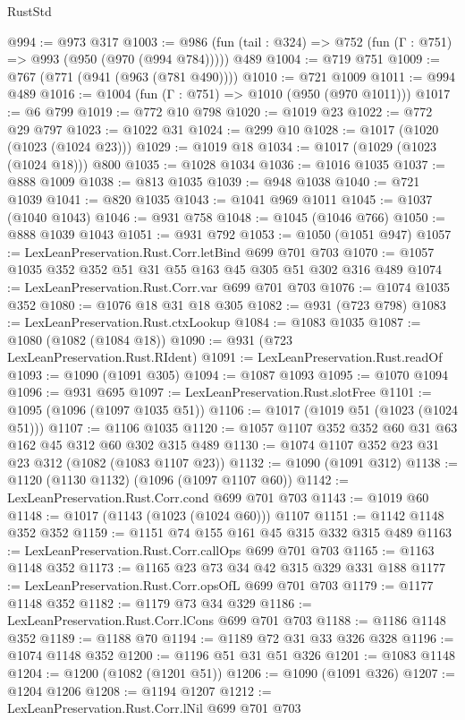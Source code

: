 \begin{lexlean}{RustStd}
\begin{coremodule}
@994 := @973 @317
@1003 := @986 (fun (tail : @324) => @752 (fun (Γ : @751) => @993 (@950 (@970 (@994 @784))))) @489
@1004 := @719 @751
@1009 := @767 (@771 (@941 (@963 (@781 @490))))
@1010 := @721 @1009
@1011 := @994 @489
@1016 := @1004 (fun (Γ : @751) => @1010 (@950 (@970 @1011)))
@1017 := @6 @799
@1019 := @772 @10 @798
@1020 := @1019 @23
@1022 := @772 @29 @797
@1023 := @1022 @31
@1024 := @299 @10
@1028 := @1017 (@1020 (@1023 (@1024 @23)))
@1029 := @1019 @18
@1034 := @1017 (@1029 (@1023 (@1024 @18))) @800
@1035 := @1028 @1034
@1036 := @1016 @1035
@1037 := @888 @1009
@1038 := @813 @1035
@1039 := @948 @1038
@1040 := @721 @1039
@1041 := @820 @1035
@1043 := @1041 @969 @1011
@1045 := @1037 (@1040 @1043)
@1046 := @931 @758
@1048 := @1045 (@1046 @766)
@1050 := @888 @1039 @1043
@1051 := @931 @792
@1053 := @1050 (@1051 @947)
@1057 := LexLeanPreservation.Rust.Corr.letBind @699 @701 @703
@1070 := @1057 @1035 @352 @352 @51 @31 @55 @163 @45 @305 @51 @302 @316 @489
@1074 := LexLeanPreservation.Rust.Corr.var @699 @701 @703
@1076 := @1074 @1035 @352
@1080 := @1076 @18 @31 @18 @305
@1082 := @931 (@723 @798)
@1083 := LexLeanPreservation.Rust.ctxLookup
@1084 := @1083 @1035
@1087 := @1080 (@1082 (@1084 @18))
@1090 := @931 (@723 LexLeanPreservation.Rust.RIdent)
@1091 := LexLeanPreservation.Rust.readOf
@1093 := @1090 (@1091 @305)
@1094 := @1087 @1093
@1095 := @1070 @1094
@1096 := @931 @695
@1097 := LexLeanPreservation.Rust.slotFree
@1101 := @1095 (@1096 (@1097 @1035 @51))
@1106 := @1017 (@1019 @51 (@1023 (@1024 @51)))
@1107 := @1106 @1035
@1120 := @1057 @1107 @352 @352 @60 @31 @63 @162 @45 @312 @60 @302 @315 @489
@1130 := @1074 @1107 @352 @23 @31 @23 @312 (@1082 (@1083 @1107 @23))
@1132 := @1090 (@1091 @312)
@1138 := @1120 (@1130 @1132) (@1096 (@1097 @1107 @60))
@1142 := LexLeanPreservation.Rust.Corr.cond @699 @701 @703
@1143 := @1019 @60
@1148 := @1017 (@1143 (@1023 (@1024 @60))) @1107
@1151 := @1142 @1148 @352 @352
@1159 := @1151 @74 @155 @161 @45 @315 @332 @315 @489
@1163 := LexLeanPreservation.Rust.Corr.callOps @699 @701 @703
@1165 := @1163 @1148 @352
@1173 := @1165 @23 @73 @34 @42 @315 @329 @331 @188
@1177 := LexLeanPreservation.Rust.Corr.opsOfL @699 @701 @703
@1179 := @1177 @1148 @352
@1182 := @1179 @73 @34 @329
@1186 := LexLeanPreservation.Rust.Corr.lCons @699 @701 @703
@1188 := @1186 @1148 @352
@1189 := @1188 @70
@1194 := @1189 @72 @31 @33 @326 @328
@1196 := @1074 @1148 @352
@1200 := @1196 @51 @31 @51 @326
@1201 := @1083 @1148
@1204 := @1200 (@1082 (@1201 @51))
@1206 := @1090 (@1091 @326)
@1207 := @1204 @1206
@1208 := @1194 @1207
@1212 := LexLeanPreservation.Rust.Corr.lNil @699 @701 @703

\end{coremodule}
\end{lexlean}
